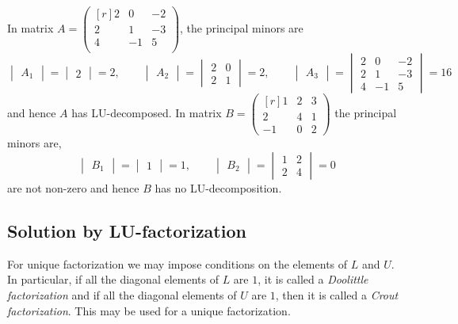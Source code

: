 \documentclass[12pt,class=book,crop=false]{standalone}
\begin{document}
In matrix $ A =\begin{pmatrix*}[r]
        2 & 0& -2\\
        2 & 1& -3\\
        4 & -1& 5\\
    \end{pmatrix*}$, the principal minors are
\[
    \begin{vmatrix}
        A_1
    \end{vmatrix}=\begin{vmatrix}
        2
    \end{vmatrix}=2,\qquad
    \begin{vmatrix}
        A_2
    \end{vmatrix}=\begin{vmatrix}
        2 & 0 \\
        2 & 1
    \end{vmatrix}=2,\qquad
    \begin{vmatrix}
        A_3
    \end{vmatrix}=\begin{vmatrix}
        2 & 0  & -2 \\
        2 & 1  & -3 \\
        4 & -1 & 5
    \end{vmatrix}=16
\]
and hence $ A $ has LU-decomposed.
In matrix $B=\begin{pmatrix*}[r]
        1&2&3\\
        2&4&1\\
        -1&0&2
    \end{pmatrix*} $ the principal minors are,
\[
    \begin{vmatrix}
        B_1
    \end{vmatrix}=\begin{vmatrix}
        1
    \end{vmatrix}=1, \qquad
    \begin{vmatrix}
        B_2
    \end{vmatrix}=\begin{vmatrix}
        1 & 2 \\
        2 & 4
    \end{vmatrix}=0
\]
are not non-zero and hence $ B $ has no LU-decomposition.
\subsection{Solution by LU-factorization}
For unique factorization we may impose conditions on the elements of $ L $ and $ U $. In particular, if all the diagonal elements of $ L $ are $ 1 $, it is called a \emph{Doolittle factorization} and if all the diagonal elements of $ U $ are $ 1 $, then it is called a \emph{Crout factorization}. This may be used for a unique factorization.
\end{document}
